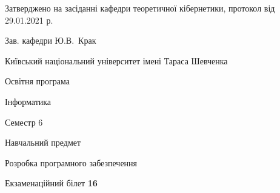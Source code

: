 \documentclass[10pt, ukrainian]{article}
\begin{document}
{\vspace{5mm}\smallskip \begin {small} Затверджено на засіданні кафедри теоретичної кібернетики, протокол  від   29.01.2021 р.\par\smallskip\smallskip
{\parbox {6.5 cm}{Зав. кафедри \dotfill Ю.В.~Крак}} \end{small}}
\newpage

{{\begin {small}\par
{ \center  Київський національний університет імені Тараса Шевченка \par}
{\parbox {5 cm}{Освітня програма \hfill}{\parbox {7 cm}{Інформатика \hfill}}\parbox {6 cm}{\hfill Семестр 6}}\par
{\parbox {5 cm} {Навчальний предмет \hfill}\parbox {7 cm}{Розробка програмного забезпечення \hfill}\parbox {6cm}{\hfill}\par}\vspace{-7pt} \end{small}}{\center Екзаменаційний білет \No \textbf
{ 16 }\par}}
\end{document}
